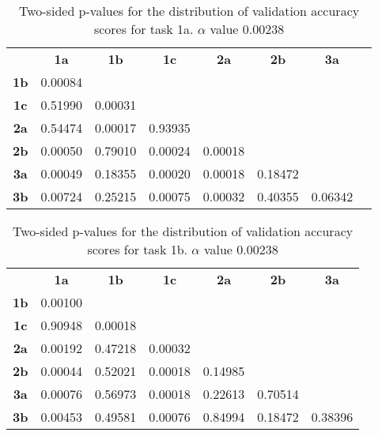 \begin{table}[!ht]
    \centering
    \begin{tabular}{cccccccc}
                & \textbf{1a} & \textbf{1b} & \textbf{1c} & \textbf{2a} & \textbf{2b}  & \textbf{3a}  \\
    \textbf{1b} & 0.00084 &         &         &          &         &         \\
    \textbf{1c} & 0.51990 & 0.00031 &         &          &         &         \\
    \textbf{2a} & 0.54474 & 0.00017 & 0.93935 &          &         &         \\
    \textbf{2b} & 0.00050 & 0.79010 & 0.00024 &  0.00018 &         &         \\
    \textbf{3a} & 0.00049 & 0.18355 & 0.00020 &  0.00018 & 0.18472 &         \\
    \textbf{3b} & 0.00724 & 0.25215 & 0.00075 &  0.00032 & 0.40355 & 0.06342 
    \end{tabular}
    \caption[Experiment 2: p-table for validation accuracy (task 1a)]{Two-sided p-values for the distribution of validation accuracy scores for task 1a. \(\alpha\) value 0.00238}
    \label{tab:exp2.validation1a}
\end{table}

\begin{table}[!ht]
    \centering
    \begin{tabular}{ccccccc}
                & \textbf{1a} & \textbf{1b} & \textbf{1c} & \textbf{2a}  & \textbf{2b}  & \textbf{3a}  \\
    \textbf{1b} & 0.00100 &         &         &         &         &         \\
    \textbf{1c} & 0.90948 & 0.00018 &         &         &         &         \\
    \textbf{2a} & 0.00192 & 0.47218 & 0.00032 &         &         &         \\
    \textbf{2b} & 0.00044 & 0.52021 & 0.00018 & 0.14985 &         &         \\
    \textbf{3a} & 0.00076 & 0.56973 & 0.00018 & 0.22613 & 0.70514 &         \\
    \textbf{3b} & 0.00453 & 0.49581 & 0.00076 & 0.84994 & 0.18472 & 0.38396
    \end{tabular}
    \caption[Experiment 2: p-table for validation accuracy (task 1b)]{Two-sided p-values for the distribution of validation accuracy scores for task 1b. \(\alpha\) value 0.00238}
    \label{tab:exp2.validation1b}
\end{table}

